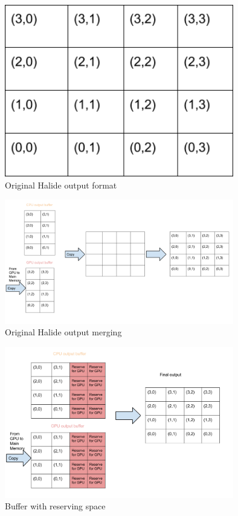 \begin{figure}[!hbtp]
\centering
\includegraphics[width=10cm]{img/memory_full.png}
\caption{Original Halide output format}
\label{fig:Halide_default}
\end{figure}

\begin{figure}[!hbtp]
\centering
\includegraphics[width=10cm]{img/Memory_copy.png}
\caption{Original Halide output merging}
\label{fig:Halide_default1}
\end{figure}

\begin{figure}[!hbtp]
\centering
\includegraphics[width=10cm]{img/Memory_copy_new.png}
\caption{Buffer with reserving space}
\label{fig:memory_new}
\end{figure}



